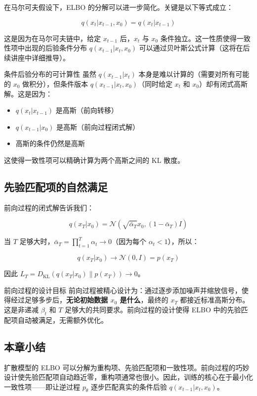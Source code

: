 在马尔可夫假设下，ELBO 的分解可以进一步简化。关键是以下等式成立：

$$q(x_t | x_{t-1}, x_0) = q(x_t | x_{t-1})$$

这是因为在马尔可夫链中，给定 $x_{t-1}$ 后，$x_t$ 与 $x_0$ 条件独立。这一性质使得一致性项中出现的后验条件分布 $q(x_{t-1}|x_t, x_0)$ 可以通过贝叶斯公式计算（这将在后续讲座中详细推导）。

\begin{knowledgebox}{条件后验分布的可计算性}
虽然 $q(x_{t-1}|x_t)$ 本身是难以计算的（需要对所有可能的 $x_0$ 做积分），但条件版本 $q(x_{t-1}|x_t, x_0)$（同时给定 $x_t$ 和 $x_0$）却有闭式高斯解。这是因为：
\begin{itemize}
    \item $q(x_t|x_{t-1})$ 是高斯（前向转移）
    \item $q(x_{t-1}|x_0)$ 是高斯（前向过程闭式解）
    \item 高斯的条件仍然是高斯
\end{itemize}
这使得一致性项可以精确计算为两个高斯之间的 KL 散度。
\end{knowledgebox}

\subsection{先验匹配项的自然满足}

前向过程的闭式解告诉我们：

$$q(x_T | x_0) = \mathcal{N}(\sqrt{\bar{\alpha}_T} x_0, (1-\bar{\alpha}_T) I)$$

当 $T$ 足够大时，$\bar{\alpha}_T = \prod_{t=1}^T \alpha_t \to 0$（因为每个 $\alpha_t < 1$），所以：

$$q(x_T | x_0) \to \mathcal{N}(0, I) = p(x_T)$$

因此 $L_T = D_{\text{KL}}(q(x_T|x_0) \| p(x_T)) \to 0$。

\begin{importantbox}{前向过程的设计目标}
前向过程被精心设计为：通过逐步添加噪声并缩放信号，使得经过足够多步后，\textbf{无论初始数据 $x_0$ 是什么}，最终的 $x_T$ 都接近标准高斯分布。这是非递减 $\beta_t$ 和 $T$ 足够大的共同要求。前向过程的设计使得 ELBO 中的先验匹配项自动被满足，无需额外优化。
\end{importantbox}

\subsection{本章小结}

扩散模型的 ELBO 可以分解为重构项、先验匹配项和一致性项。前向过程的巧妙设计使先验匹配项自动趋近零，重构项通常也很小。因此，训练的核心在于最小化一致性项——即让逆过程 $p_\theta$ 逐步匹配真实的条件后验 $q(x_{t-1}|x_t, x_0)$。


